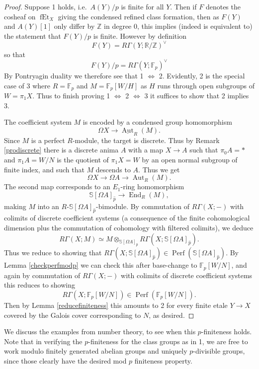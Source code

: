 \documentclass[12pt]{article}
\theoremstyle{definition}
\newcommand{\on}{\operatorname}
\newcommand{\mbb}{\mathbb}
\newcommand{\wh}{\widehat}
\newcommand{\ul}{\underline}
\begin{document}
\begin{proof}
Suppose 1 holds, i.e.\ $A(Y)/p$ is finite for all $Y$.  Then if $F$ denotes the cosheaf on $\on{fEt}_X$ giving the condensed refined class formation, then as $F(Y)$ and $A(Y)[1]$ only differ by $\mbb{Z}$ in degree $0$, this implies (indeed is equivalent to) the statement that $F(Y)/p$ is finite.  However by definition
$$F(Y) = R\Gamma(Y;\mbb{R}/\mbb{Z})^\vee$$
so that
$$F(Y)/p = R\Gamma(Y;\mbb{F}_p)^\vee$$
By Pontryagin duality we therefore see that 1 $\Leftrightarrow$ 2.  Evidently, 2 is the special case of 3 where $R=\mbb{F}_p$ and $M=\mbb{F}_p[W/H]$ as $H$ runs through open subgroups of $W=\pi_1X$.  Thus to finish proving 1 $\Leftrightarrow$ 2 $\Leftrightarrow$ 3 it suffices to show that 2 implies 3.

The coefficient system $M$ is encoded by a condensed group homomorphism
$$\Omega X \to \ul{\on{Aut}}_R(M).$$
Since $M$ is a perfect $R$-module, the target is discrete.  Thus by Remark \ref{prodiscrete} there is a discrete anima $A$ with a map $X\to A$ such that $\pi_0A=\ast$ and $\pi_1A=W/N$ is the quotient of $\pi_1X=W$ by an open normal subgroup of finite index, and such that $M$ descends to $A$.  Thus we get
$$\Omega X \to \Omega A \to \on{Aut}_R(M).$$
The second map corresponds to an $E_1$-ring homomorphism
$$\mbb{S}[\Omega A]_{\wh{p}} \to \on{End}_R(M),$$
making $M$ into an $R$-$\mbb{S}[\Omega A]_{\wh{p}}$-bimodule.  By commutation of $R\Gamma(X;-)$ with colimits of discrete coefficient systems (a consequence of the finite cohomological dimension plus the commutation of cohomology with filtered colimits), we deduce
$$R\Gamma(X;M) \simeq M\otimes_{\mbb{S}[\Omega A]_{\wh{p}}}R\Gamma(X;\mbb{S}[\Omega A]_{\wh{p}}).$$
Thus we reduce to showing that $R\Gamma(X;\mbb{S}[\Omega A]_{\wh{p}})\in \on{Perf}(\mbb{S}[\Omega A]_{\wh{p}})$.  By Lemma \ref{checkperfmodp} we can check this after base-change to $\mbb{F}_p[W/N]$, and again by commutation of $R\Gamma(X;-)$ with colimits of discrete coefficient systems this reduces to showing
$$R\Gamma(X;\mbb{F}_p[W/N])\in\on{Perf}(\mbb{F}_p[W/N]).$$
Then by Lemma \ref{reducefiniteness} this amounts to 2 for every finite etale $Y\to X$ covered by the Galois cover corresponding to $N$, as desired. 
\end{proof}

We discuss the examples from number theory, to see when this $p$-finiteness holds.  Note that in verifying the $p$-finiteness for the class groups as in 1, we are free to work modulo finitely generated abelian groups and uniquely $p$-divisible groups, since those clearly have the desired mod $p$ finiteness property.
\end{document}
